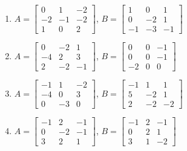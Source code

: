 \begin{reduce}
\begin{exercise}
\begin{enumerate}
\item \(A=\begin{bmatrix} 0 & 1 & -2
\\ -2 & -1 & -2
\\ 1 & 0 & 2 \end{bmatrix}\),
\(B=\begin{bmatrix} 1 & 0 & 1
\\ 0 & -2 & 1
\\ -1 & -3 & -1 \end{bmatrix}\)

\item \(A=\begin{bmatrix} 0 & -2 & 1
\\ -4 & 2 & 3
\\ 2 & -2 & -1 \end{bmatrix}\),
\(B=\begin{bmatrix} 0 & 0 & -1
\\ 0 & 0 & -1
\\ -2 & 0 & 0 \end{bmatrix}\)

\item \(A=\begin{bmatrix} -1 & 1 & -2
\\ -4 & 0 & 3
\\ 0 & -3 & 0 \end{bmatrix}\),
\(B=\begin{bmatrix} -1 & 1 & 1
\\ 5 & -2 & 1
\\ 2 & -2 & -2 \end{bmatrix}\)

\item \(A=\begin{bmatrix} -1 & 2 & -1
\\ 0 & -2 & -1
\\ 3 & 2 & 1 \end{bmatrix}\),
\(B=\begin{bmatrix} -1 & 2 & -1
\\ 0 & 2 & 1
\\ 3 & 1 & -2 \end{bmatrix}\)


\end{enumerate}
\end{exercise}
\end{reduce}
